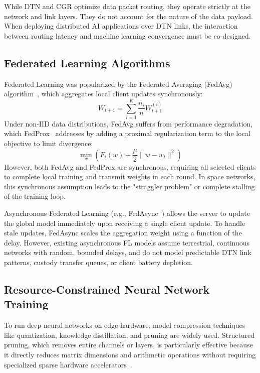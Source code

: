 \documentclass[journal,twocolumn]{IEEEtran}
\newcommand{\cgr}{\textsf{CGR}}
\newcommand{\dtn}{\textsf{DTN}}
\newcommand{\fedavg}{\textsf{FedAvg}}
\newcommand{\fedprox}{\textsf{FedProx}}
\begin{document}
While \dtn{} and \cgr{} optimize data packet routing, they operate strictly at the network and link layers. They do not account for the nature of the data payload. When deploying distributed AI applications over DTN links, the interaction between routing latency and machine learning convergence must be co-designed.

\subsection{Federated Learning Algorithms}
Federated Learning was popularized by the Federated Averaging (\fedavg{}) algorithm~\cite{mcmahan2017communication}, which aggregates local client updates synchronously:
\begin{equation}
    W_{t+1} = \sum_{i=1}^K \frac{n_i}{n} W_{t+1}^{(i)}
\end{equation}
Under non-IID data distributions, \fedavg{} suffers from performance degradation, which \fedprox{}~\cite{li2020federated} addresses by adding a proximal regularization term to the local objective to limit divergence:
\begin{equation}
    \min_{w} \left( F_i(w) + \frac{\mu}{2} \| w - w_t \|^2 \right)
\end{equation}
However, both \fedavg{} and \fedprox{} are synchronous, requiring all selected clients to complete local training and transmit weights in each round. In space networks, this synchronous assumption leads to the "straggler problem" or complete stalling of the training loop.

Asynchronous Federated Learning (e.g., FedAsync~\cite{xie2019asynchronous}) allows the server to update the global model immediately upon receiving a single client update. To handle stale updates, FedAsync scales the aggregation weight using a function of the delay. However, existing asynchronous FL models assume terrestrial, continuous networks with random, bounded delays, and do not model predictable DTN link patterns, custody transfer queues, or client battery depletion.

\subsection{Resource-Constrained Neural Network Training}
To run deep neural networks on edge hardware, model compression techniques like quantization, knowledge distillation, and pruning are widely used. Structured pruning, which removes entire channels or layers, is particularly effective because it directly reduces matrix dimensions and arithmetic operations without requiring specialized sparse hardware accelerators~\cite{liu2018rethinking}.
\end{document}
